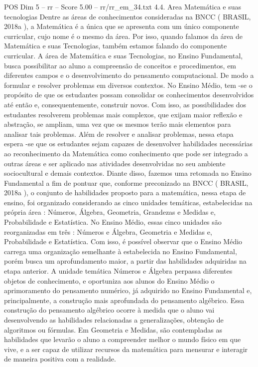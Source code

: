 \begin{textsample}{POS Dim 5 – rr – Score 5.00 – rr/rr\_em\_34.txt}  \label{ex:f5_pos_225}
4.4.
Area Matemática e suas tecnologias Dentre as áreas de conhecimentos consideradas na BNCC ( BRASIL, 2018a ), a Matemática é a única que se apresenta com um único componente curricular, cujo nome é o mesmo da área.
Por isso, quando falamos da área de Matemática e suas Tecnologias, também estamos falando do componente curricular.
A área de Matemática e suas Tecnologias, no Ensino Fundamental, busca possibilitar ao aluno a compreensão de conceitos e procedimentos, em diferentes campos e o desenvolvimento do pensamento computacional.
De modo a formular e resolver problemas em diversos contextos.
No Ensino Médio, tem -se o propósito de que os estudantes possam consolidar os conhecimentos desenvolvidos até então e, consequentemente, construir novos.
Com isso, as possibilidades dos estudantes resolverem problemas mais complexos, que exijam maior reflexão e abstração, se ampliam, uma vez que os mesmos terão mais elementos para analisar tais problemas.
Além de resolver e analisar problemas, nessa etapa espera -se que os estudantes sejam capazes de desenvolver habilidades necessárias ao reconhecimento da Matemática como conhecimento que pode ser integrado a outras áreas e ser aplicado nas atividades desenvolvidas no seu ambiente sociocultural e demais contextos.
Diante disso, fazemos uma retomada no Ensino Fundamental a fim de pontuar que, conforme preconizado na BNCC ( BRASIL, 2018a ), o conjunto de habilidades proposto para a matemática, nessa etapa de ensino, foi organizado considerando as cinco unidades temáticas, estabelecidas na própria área : Números, Álgebra, Geometria, Grandezas e Medidas e, Probabilidade e Estatística.
No Ensino Médio, essas cinco unidades são reorganizadas em três : Números e Álgebra, Geometria e Medidas e, Probabilidade e Estatística.
Com isso, é possível observar que o Ensino Médio carrega uma organização semelhante à estabelecida no Ensino Fundamental, porém busca um aprofundamento maior, a partir das habilidades adquiridas na etapa anterior.
A unidade temática Números e Álgebra perpassa diferentes objetos de conhecimento, e oportuniza aos alunos do Ensino Médio o aprimoramento do pensamento numérico, já adquirido no Ensino Fundamental e, principalmente, a construção mais aprofundada do pensamento algébrico.
Essa construção do pensamento algébrico ocorre à medida que o aluno vai desenvolvendo as habilidades relacionadas a generalizações, obtenção de algoritmos ou fórmulas.
Em Geometria e Medidas, são contempladas as habilidades que levarão o aluno a compreender melhor o mundo físico em que vive, e a ser capaz de utilizar recursos da matemática para mensurar e interagir de maneira positiva com a realidade.

\end{textsample}

